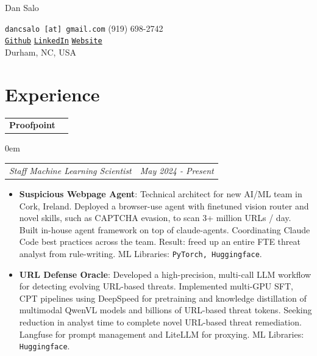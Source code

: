 \documentclass[letterpaper,11pt]{article}
\makeatletter
\newcommand{\resumeItem}[2]{
	\item\small{
		\textbf{#1}{: #2}
	}
}
\newcommand{\mllibs}[1]{\texttt{\small #1}}
\newcommand{\resumeSubSubheading}[2]{
	\begin{addmargin}[1em]{0em}
		\begin{tabular*}{0.97\textwidth}{l@{\extracolsep{\fill}}r}
			\textit{#1} & \textit{\small #2} \\
		\end{tabular*}
	\end{addmargin}
}
\newcommand{\resumeItemListStart}{\begin{itemize}[itemsep=2pt, topsep=3pt]}
\newcommand{\resumeItemListEnd}{\end{itemize}}
\newcommand{\resumeJob}[3]{
	\begin{tabular*}{0.97\textwidth}{l@{\extracolsep{\fill}}r}
		\textbf{#1} & #2 \\
	\end{tabular*}
	\small{#3} 
}
\makeatother
\begin{document}
	
	\begin{minipage}[t][1cm][b]{0.3\textwidth}
		\hspace{-\hoffset}\raggedright \Huge {} Dan Salo \normalsize
	\end{minipage}
	\begin{minipage}[t][1.2cm][b]{0.69\textwidth}
		\footnotesize
		\raggedleft
		\texttt{dancsalo [at] gmail.com} \hspace{0.1cm}\textbullet \hspace{0.1cm} (919) 698-2742 \\
		\texttt{\href{https://github.com/dancsalo}{Github}} \hspace{0.1cm}\textbullet \hspace{0.1cm}
		\texttt{\href{https://www.linkedin.com/in/dancsalo/}{LinkedIn}} \hspace{0.1cm}\textbullet \hspace{0.1cm}
		\texttt{\href{https://dancsalo.github.io}{Website}}
		\vspace{1pt}
		\\ Durham, NC, USA
	\end{minipage}
	
	
	\section{Experience}
	\resumeJob{Proofpoint}{}{}
		\vspace{3pt}
	
	\resumeSubSubheading{Staff Machine Learning Scientist}{May 2024 - Present}
	\resumeItemListStart
	\resumeItem{Suspicious Webpage Agent}
	{Technical architect for new AI/ML team in Cork, Ireland. Deployed a browser-use agent with finetuned vision router and novel skills, such as CAPTCHA evasion, to scan 3+ million URLs / day. Built in-house agent framework on top of claude-agents. Coordinating Claude Code best practices across the team. Result: freed up an entire FTE threat analyst from rule-writing. ML Libraries: \mllibs{PyTorch, Huggingface}.}
	
	\resumeItem{URL Defense Oracle}
	{Developed a high-precision, multi-call LLM workflow for detecting evolving URL-based threats. Implemented multi-GPU SFT, CPT pipelines using DeepSpeed for pretraining and knowledge distillation of multimodal QwenVL models and billions of URL-based threat tokens. Seeking reduction in analyst time to complete novel URL-based threat remediation. Langfuse for prompt management and LiteLLM for proxying. ML Libraries: \mllibs{Huggingface}.}
	\resumeItemListEnd
	
\end{document}
